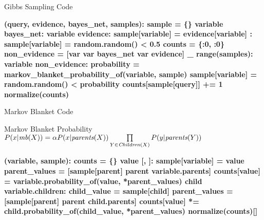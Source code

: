 \documentclass[14pt]{beamer}
\begin{document}
\begin{frame}[fragile]{Gibbs Sampling Code}
\begin{semiverbatim}\scriptsize\bfseries
{} (query, evidence, bayes_net, samples):
    \pause{}
    sample = \{\}
     variable  bayes_net:
         variable  evidence:
            sample[variable] = evidence[variable]
        :
            sample[variable] = random.random() < 0.5
    \pause{}
    counts = \{:\num{0}, :\num{0}\}
    non_evidence = [var  var  bayes_net  var  evidence]
     _  range(samples):
         variable  non_evidence:
            \pause{}
            probability = markov_blanket_probability_of(variable, sample)
            sample[variable] = random.random() < probability
        counts[sample[query]] += \num{1}
    \pause{}
     normalize(counts)
\end{semiverbatim}
\end{frame}

\begin{frame}[fragile]{Markov Blanket Code}
\begin{block}{Markov Blanket Probability}
\small 
$P(x|\textit{mb}(X)) = \alpha P(x|\textit{parents}(X)) \prod\limits_{Y \in \textit{\scriptsize Children}(X)}P(y|\textit{parents}(Y))$
\end{block}
\pause
\begin{semiverbatim}\scriptsize\bfseries
{} (variable, sample):
    \pause{}
    counts = \{\}
     value  [, ]:
        \pause{}
        sample[variable] = value
        \pause{}
        parent_values = [sample[parent]  parent  variable.parents]
        counts[value] = variable.probability_of(value, *parent_values)
        \pause{}
         child  variable.children:
            child_value = sample[child]
            parent_values = [sample[parent]  parent  child.parents]
            counts[value] *= child.probability_of(child_value, *parent_values)
    \pause{}
     normalize(counts)[]
\end{semiverbatim}
\end{frame}
\end{document}
